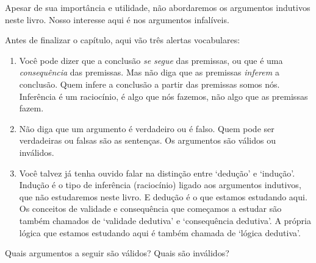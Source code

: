 Apesar de sua importância e utilidade, não abordaremos os argumentos indutivos neste livro.
Nosso interesse aqui é nos argumentos infalíveis.

Antes de finalizar o capítulo, aqui vão três alertas vocabulares:
\begin{enumerate}
	\item Você pode dizer que a conclusão \textit{se segue} das premissas, ou que é uma \textit{consequência} das premissas. Mas não diga que as premissas  \textit{inferem} a conclusão.
	Quem infere a conclusão a partir das premissas somos nós.
	 Inferência é um raciocínio, é algo que nós fazemos, não algo que as premissas fazem.
	\item Não diga que um argumento é verdadeiro ou é falso.
		Quem pode ser verdadeiras ou falsas são as sentenças.
		Os argumentos são válidos ou inválidos.
	\item Você talvez já tenha ouvido falar na distinção entre `dedução' e `indução'.
	Indução é o tipo de inferência (raciocínio) ligado aos argumentos indutivos, que não estudaremos neste livro. E dedução é o que estamos estudando aqui.
	Os conceitos de validade e consequência que começamos a estudar são também chamados de `validade dedutiva' e `consequência dedutiva'.
	A própria lógica que estamos estudando aqui é também chamada de `lógica dedutiva'.
\end{enumerate}


\practiceproblems
\problempart
Quais argumentos a seguir são válidos? Quais são inválidos?

